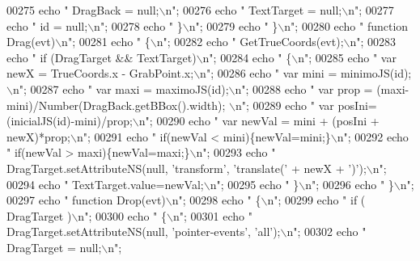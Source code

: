\begin{DoxyCode}
{{00275     echo \textcolor{stringliteral}{"             DragBack = null;\(\backslash\)n"};
00276     echo \textcolor{stringliteral}{"             TextTarget = null;\(\backslash\)n"};
00277     echo \textcolor{stringliteral}{"             id = null;\(\backslash\)n"};
00278     echo \textcolor{stringliteral}{"           \}\(\backslash\)n"};
00279     echo \textcolor{stringliteral}{"        \}\(\backslash\)n"};
00280     echo \textcolor{stringliteral}{"        function Drag(evt)\(\backslash\)n"};
00281     echo \textcolor{stringliteral}{"        \{\(\backslash\)n"};
00282     echo \textcolor{stringliteral}{"           GetTrueCoords(evt);\(\backslash\)n"};
00283     echo \textcolor{stringliteral}{"           if (DragTarget && TextTarget)\(\backslash\)n"};
00284     echo \textcolor{stringliteral}{"           \{\(\backslash\)n"};
00285     echo \textcolor{stringliteral}{"             var newX = TrueCoords.x - GrabPoint.x;\(\backslash\)n"};
00286     echo \textcolor{stringliteral}{"             var mini = minimoJS(id);\(\backslash\)n"};
00287     echo \textcolor{stringliteral}{"             var maxi = maximoJS(id);\(\backslash\)n"};
00288     echo \textcolor{stringliteral}{"             var prop = (maxi-mini)/Number(DragBack.getBBox().width);
      \(\backslash\)n"};
00289     echo \textcolor{stringliteral}{"             var posIni= (inicialJS(id)-mini)/prop;\(\backslash\)n"};
00290     echo \textcolor{stringliteral}{"             var newVal = mini + (posIni + newX)*prop;\(\backslash\)n"};
00291     echo \textcolor{stringliteral}{"             if(newVal < mini)\{newVal=mini;\}\(\backslash\)n"};
00292     echo \textcolor{stringliteral}{"             if(newVal > maxi)\{newVal=maxi;\}\(\backslash\)n"};
00293     echo \textcolor{stringliteral}{"             DragTarget.setAttributeNS(null, 'transform',
       'translate(' + newX + ')');\(\backslash\)n"};
00294     echo \textcolor{stringliteral}{"             TextTarget.value=newVal;\(\backslash\)n"};
00295     echo \textcolor{stringliteral}{"           \}\(\backslash\)n"};
00296     echo \textcolor{stringliteral}{"        \}\(\backslash\)n"};
00297     echo \textcolor{stringliteral}{"        function Drop(evt)\(\backslash\)n"};
00298     echo \textcolor{stringliteral}{"        \{\(\backslash\)n"};
00299     echo \textcolor{stringliteral}{"           if ( DragTarget )\(\backslash\)n"};
00300     echo \textcolor{stringliteral}{"           \{\(\backslash\)n"};
00301     echo \textcolor{stringliteral}{"             DragTarget.setAttributeNS(null, 'pointer-events',
       'all');\(\backslash\)n"};
00302     echo \textcolor{stringliteral}{"             DragTarget = null;\(\backslash\)n"};
}}
\end{DoxyCode}
